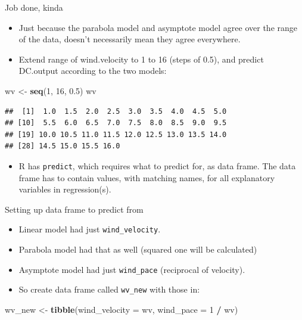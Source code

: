 \documentclass[
  ignorenonframetext,
]{beamer}
\newenvironment{Shaded}{\begin{snugshade}}{\end{snugshade}}
\newcommand{\DataTypeTok}[1]{\textcolor[rgb]{0.13,0.29,0.53}{#1}}
\newcommand{\DecValTok}[1]{\textcolor[rgb]{0.00,0.00,0.81}{#1}}
\newcommand{\FloatTok}[1]{\textcolor[rgb]{0.00,0.00,0.81}{#1}}
\newcommand{\KeywordTok}[1]{\textcolor[rgb]{0.13,0.29,0.53}{\textbf{#1}}}
\newcommand{\NormalTok}[1]{#1}
\newcommand{\OperatorTok}[1]{\textcolor[rgb]{0.81,0.36,0.00}{\textbf{#1}}}
\newcommand{\StringTok}[1]{\textcolor[rgb]{0.31,0.60,0.02}{#1}}
\providecommand{\tightlist}{%
  \setlength{\itemsep}{0pt}\setlength{\parskip}{0pt}}
\begin{document}
\begin{frame}[fragile]{Job done, kinda}
\protect\hypertarget{job-done-kinda}{}

\begin{itemize}
\tightlist
\item
  Just because the parabola model and asymptote model agree over the
  range of the data, doesn't necessarily mean they agree everywhere.
\item
  Extend range of wind.velocity to 1 to 16 (steps of 0.5), and predict
  DC.output according to the two models:
\end{itemize}

\begin{Shaded}
\begin{Highlighting}[]
\NormalTok{wv <-}\StringTok{ }\KeywordTok{seq}\NormalTok{(}\DecValTok{1}\NormalTok{, }\DecValTok{16}\NormalTok{, }\FloatTok{0.5}\NormalTok{)}
\NormalTok{wv}
\end{Highlighting}
\end{Shaded}

\begin{verbatim}
##  [1]  1.0  1.5  2.0  2.5  3.0  3.5  4.0  4.5  5.0
## [10]  5.5  6.0  6.5  7.0  7.5  8.0  8.5  9.0  9.5
## [19] 10.0 10.5 11.0 11.5 12.0 12.5 13.0 13.5 14.0
## [28] 14.5 15.0 15.5 16.0
\end{verbatim}

\begin{itemize}
\tightlist
\item
  R has \texttt{predict}, which requires what to predict for, as data
  frame. The data frame has to contain values, with matching names, for
  all explanatory variables in regression(s).
\end{itemize}

\end{frame}

\begin{frame}[fragile]{Setting up data frame to predict from}
\protect\hypertarget{setting-up-data-frame-to-predict-from}{}

\begin{itemize}
\tightlist
\item
  Linear model had just \texttt{wind\_velocity}.
\item
  Parabola model had that as well (squared one will be calculated)
\item
  Asymptote model had just \texttt{wind\_pace} (reciprocal of velocity).
\item
  So create data frame called \texttt{wv\_new} with those in:
\end{itemize}

\begin{Shaded}
\begin{Highlighting}[]
\NormalTok{wv_new <-}\StringTok{ }\KeywordTok{tibble}\NormalTok{(}\DataTypeTok{wind_velocity =}\NormalTok{ wv, }\DataTypeTok{wind_pace =} \DecValTok{1} \OperatorTok{/}\StringTok{ }\NormalTok{wv)}
\end{Highlighting}
\end{Shaded}

\end{frame}
\end{document}
